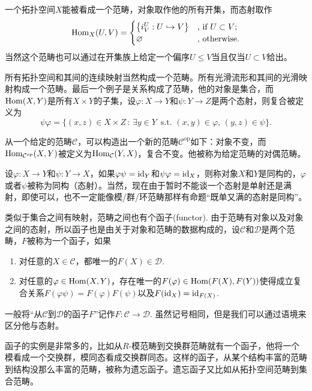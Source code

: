 一个拓扑空间$X$能被看成一个范畴，对象取作他的所有开集，而态射取作
\[
	\operatorname{Hom}_{X}(U,V)=\begin{cases}
	\bigl\{i^U_V:U\hookrightarrow V\bigr\}&\text{, if }U\subset V\text{;}\\
	\varnothing&\text{, otherwise}.
	\end{cases}
\]
当然这个范畴也可以通过在开集族上给定一个偏序$U\leq V$当且仅当$U\subset V$给出。

所有拓扑空间和其间的连续映射当然构成一个范畴。所有光滑流形和其间的光滑映射构成一个范畴。最后一个例子是关系构成了范畴，他的对象是集合，而$\operatorname{Hom}(X,Y)$是所有$X\times Y$的子集，设$\varphi:X\to Y$和$\psi:Y\to Z$是两个态射，则复合被定义为
\[
	\psi\varphi=\{(x,z)\in X\times Z\,:\,\exists y\in Y\,\text{ s.t. } (x,y)\in\varphi,\, (y,z)\in \psi\}.
\]

\para 从一个给定的范畴$\mathcal{C}$，可以构造出一个新的范畴$\mathcal{C}^{\mathrm{op}}$如下：对象不变，而$\operatorname{Hom}_{\mathcal{C}^{\mathrm{op}}}(X,Y)$被定义为$\operatorname{Hom}_{\mathcal{C}}(Y,X)$，复合不变。他被称为给定范畴的对偶范畴。

\para 设$\varphi:X\to Y$和$\psi:Y\to X$，如果$\varphi\psi=\operatorname{id}_Y$和$\psi\varphi=\operatorname{id}_X$，则称对象$X$和$Y$是同构的，$\varphi$或者$\psi$被称为同构（态射）。当然，现在由于暂时不能谈一个态射是单射还是满射，即使可以，也不一定能像模/群/环范畴那样有命题“既单又满的态射是同构”。

\para 类似于集合之间有映射，范畴之间也有个函子(functor). 由于范畴有对象以及对象之间的态射，所以函子也是由关于对象和范畴的数据构成的，设$\mathcal{C}$和$\mathcal{D}$是两个范畴，$F$被称为一个函子，如果
\begin{enumerate}

\item 对任意的$X\in \mathcal{C}$，都唯一的$F(X)\in \mathcal{D}$.

\item 对任意的$\varphi\in \operatorname{Hom}(X,Y)$，存在唯一的$F(\varphi)\in  \operatorname{Hom}(F(X),F(Y))$使得成立复合关系$F(\varphi\psi)=F(\varphi)F(\psi)$以及$F(\operatorname{id}_X)=\operatorname{id}_{F(X)}$.

\end{enumerate}

一般将“从$\mathcal{C}$到$\mathcal{D}$的函子$F$”记作$F:\mathcal{C}\to \mathcal{D}$. 虽然记号相同，但是我们可以通过语境来区分他与态射。

函子的实例是非常多的，比如从$R$-模范畴到交换群范畴就有一个函子，他将一个模看成一个交换群，模同态看成交换群同态。这样的函子，从某个结构丰富的范畴到结构没那么丰富的范畴，被称为遗忘函子。遗忘函子又比如从拓扑空间范畴到集合范畴。

